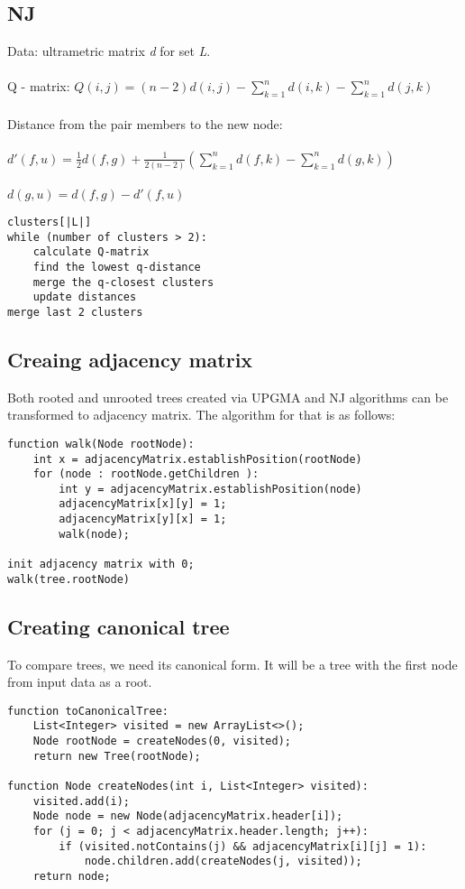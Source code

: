 \documentclass[a4paper,10pt]{article}
\begin{document}
\subsection{NJ}
Data: ultrametric matrix \textit{d} for set \textit{L}.\\ \\
Q - matrix: $ Q(i,j) = (n-2)d(i,j) - \sum_{k=1}^{n} d(i,k) - \sum_{k=1}^{n} d(j,k)$ \\ \\
Distance from the pair members to the new node: \\ \\
$d'(f,u) = \frac{1}{2}d(f,g) + \frac{1}{2(n-2)}(\sum_{k=1}^n d(f,k) - \sum_{k=1}^n d(g,k))$ \\ \\
$d(g,u) = d(f,g) - d'(f,u)$

\begin{lstlisting}[caption={NJ pseudocode}]
clusters[|L|]
while (number of clusters > 2):
    calculate Q-matrix
    find the lowest q-distance
    merge the q-closest clusters
    update distances
merge last 2 clusters
\end{lstlisting}

\subsection{Creaing adjacency matrix}
Both rooted and unrooted trees created via UPGMA and NJ algorithms can be transformed to adjacency matrix. The algorithm for that is as follows:
\begin{lstlisting}[caption={Tree to adjacency matrix.}]
function walk(Node rootNode):
    int x = adjacencyMatrix.establishPosition(rootNode)
    for (node : rootNode.getChildren ):
        int y = adjacencyMatrix.establishPosition(node)
        adjacencyMatrix[x][y] = 1;
        adjacencyMatrix[y][x] = 1;
        walk(node);

init adjacency matrix with 0;
walk(tree.rootNode)
\end{lstlisting}

\subsection{Creating canonical tree}
To compare trees, we need its canonical form. It will be a tree with the first node from input data as a root.
\begin{lstlisting}[caption={Tree to adjacency matrix.}]
function toCanonicalTree:
    List<Integer> visited = new ArrayList<>();
    Node rootNode = createNodes(0, visited);
    return new Tree(rootNode);

function Node createNodes(int i, List<Integer> visited):
    visited.add(i);
    Node node = new Node(adjacencyMatrix.header[i]);
    for (j = 0; j < adjacencyMatrix.header.length; j++):
        if (visited.notContains(j) && adjacencyMatrix[i][j] = 1):
            node.children.add(createNodes(j, visited));
    return node;
\end{lstlisting}
\newpage
\end{document}

